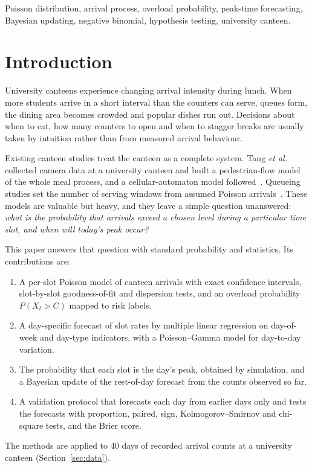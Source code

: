 \documentclass[conference,a4paper]{IEEEtran}
\begin{document}
\begin{IEEEkeywords}
Poisson distribution, arrival process, overload probability, peak-time forecasting, Bayesian updating,
negative binomial, hypothesis testing, university canteen.
\end{IEEEkeywords}

\section{Introduction}
University canteens experience changing arrival intensity during lunch. When more students arrive in a short interval
than the counters can serve, queues form, the dining area becomes crowded and popular dishes run out. Decisions about
when to eat, how many counters to open and when to stagger breaks are usually taken by intuition rather than from
measured arrival behaviour.

Existing canteen studies treat the canteen as a complete system. Tang \textit{et al.}~\cite{tang2019a} collected
camera data at a university canteen and built a pedestrian-flow model of the whole meal process, and a cellular-automaton
model followed~\cite{tang2019b}. Queueing studies set the number of serving windows from assumed Poisson
arrivals~\cite{chen2011,yuan2023,jiao2022}. These models are valuable but heavy, and they leave a simple question
unanswered: \textit{what is the probability that arrivals exceed a chosen level during a particular time slot, and
when will today's peak occur?}

This paper answers that question with standard probability and statistics. Its contributions are:
\begin{enumerate}
\item A per-slot Poisson model of canteen arrivals with exact confidence intervals, slot-by-slot goodness-of-fit and
dispersion tests, and an overload probability $P(X_t > C)$ mapped to risk labels.
\item A day-specific forecast of slot rates by multiple linear regression on day-of-week and day-type indicators,
with a Poisson--Gamma model for day-to-day variation.
\item The probability that each slot is the day's peak, obtained by simulation, and a Bayesian update of the
rest-of-day forecast from the counts observed so far.
\item A validation protocol that forecasts each day from earlier days only and tests the forecasts with proportion,
paired, sign, Kolmogorov--Smirnov and chi-square tests, and the Brier score.
\end{enumerate}
The methods are applied to 40 days of recorded arrival counts at a university canteen (Section~\ref{sec:data}).
\end{document}
